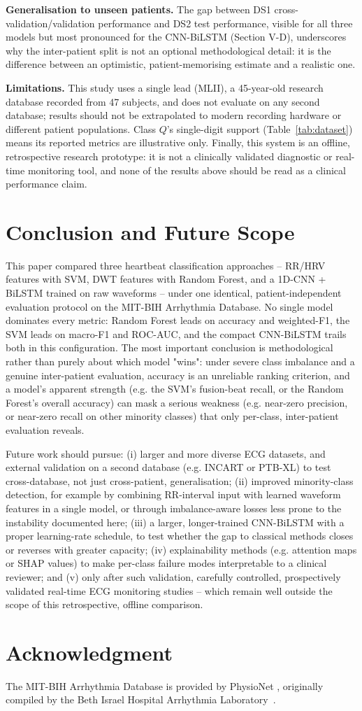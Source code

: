 \documentclass[conference]{IEEEtran}
\begin{document}
\textbf{Generalisation to unseen patients.} The gap between DS1
cross-validation/validation performance and DS2 test performance,
visible for all three models but most pronounced for the CNN-BiLSTM
(Section V-D), underscores why the inter-patient split is not an
optional methodological detail: it is the difference between an
optimistic, patient-memorising estimate and a realistic one.

\textbf{Limitations.} This study uses a single lead (MLII), a
45-year-old research database recorded from 47 subjects, and does not
evaluate on any second database; results should not be extrapolated to
modern recording hardware or different patient populations. Class $Q$'s
single-digit support (Table~\ref{tab:dataset}) means its reported metrics
are illustrative only. Finally, this system is an offline, retrospective
research prototype: it is not a clinically validated diagnostic or
real-time monitoring tool, and none of the results above should be read
as a clinical performance claim.

\section{Conclusion and Future Scope}

This paper compared three heartbeat classification approaches --
RR/HRV features with SVM, DWT features with Random Forest, and a 1D-CNN +
BiLSTM trained on raw waveforms -- under one identical, patient-independent
evaluation protocol on the MIT-BIH Arrhythmia Database. No single model
dominates every metric: Random Forest leads on accuracy and weighted-F1,
the SVM leads on macro-F1 and ROC-AUC, and the compact CNN-BiLSTM trails
both in this configuration. The most important conclusion is methodological
rather than purely about which model "wins": under severe class imbalance
and a genuine inter-patient evaluation, accuracy is an unreliable ranking
criterion, and a model's apparent strength (e.g. the SVM's fusion-beat
recall, or the Random Forest's overall accuracy) can mask a serious
weakness (e.g. near-zero precision, or near-zero recall on other minority
classes) that only per-class, inter-patient evaluation reveals.

Future work should pursue: (i) larger and more diverse ECG datasets, and
external validation on a second database (e.g. INCART or PTB-XL) to test
cross-database, not just cross-patient, generalisation; (ii) improved
minority-class detection, for example by combining RR-interval input with
learned waveform features in a single model, or through
imbalance-aware losses less prone to the instability documented here;
(iii) a larger, longer-trained CNN-BiLSTM with a proper learning-rate
schedule, to test whether the gap to classical methods closes or reverses
with greater capacity; (iv) explainability methods (e.g. attention maps
or SHAP values) to make per-class failure modes interpretable to a
clinical reviewer; and (v) only after such validation, carefully
controlled, prospectively validated real-time ECG monitoring studies --
which remain well outside the scope of this retrospective, offline
comparison.

\section*{Acknowledgment}
The MIT-BIH Arrhythmia Database is provided by PhysioNet
\cite{goldberger2000physiobank}, originally compiled by the Beth Israel
Hospital Arrhythmia Laboratory~\cite{moody2001impact}.



\end{document}
